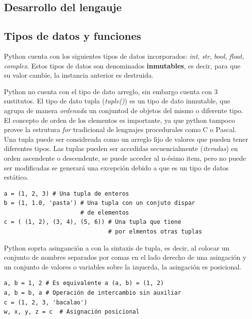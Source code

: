 \documentclass[a4paper]{report}
\begin{document}
\subsection{Desarrollo del lengauje}



\subsection{Tipos de datos y funciones}
Python cuenta con los siguientes tipos de datos incorporados: 
\emph{int}, 
\emph{str}, 
\emph{bool}, 
\emph{float}, 
\emph{complex}. Estos
tipos de datos son denominados \textbf{inmutables}, es decir, para que su valor cambie, la instancia anterior
es destruida. 

Python no cuenta con el tipo de dato arreglo, sin embargo cuenta con 3 sustitutos. 
El tipo de dato tupla (\emph{tuple()}) es un tipo de dato inmutable, que agrupa 
de manera \emph{ordenada} un conjuntod de objetos del mismo o diferente
tipo. El concepto de orden de los elementos es importante, ya que python tampoco provee la estrutura \emph{for} tradicional
de lenguajes procedurales como C o Pascal. %
Una tupla puede ser considreada como un arreglo fijo de valores que pueden
tener diferentes tipos. Las tuplas pueden ser accedidas secuencialmente (\emph{iteradas}) en orden ascendente o descendente, se puede 
acceder al n-ésimo item, pero no puede ser modificadas se generará una excepción debido 
a que es un tipo de datos estático.
\begin{lstlisting}[style=python]
a = (1, 2, 3) # Una tupla de enteros
b = (1, 1.0, 'pasta') # Una tupla con un conjuto dispar 
                      # de elementos
c = ( (1, 2), (3, 4), (5, 6)) # Una tupla que tiene 
                              # por elmentos otras tuplas
\end{lstlisting}

Python soprta asinganción a con la sintaxis de tupla, es decir, al colocar un conjunto de nombres 
separados por comas en el lado derecho de una asingación y un conjunto de valores o variables
sobre la izquerda, la asingación es posicional.
\begin{lstlisting}[style=python,label=asignacion-python,caption=Asignacion en Python]
a, b = 1, 2	# Es equivalente a (a, b) = (1, 2)
a, b = b, a	# Operación de intercambio sin auxiliar
c = (1, 2, 3, 'bacalao')
w, x, y, z = c	# Asignación posicional
\end{lstlisting}
\end{document}
